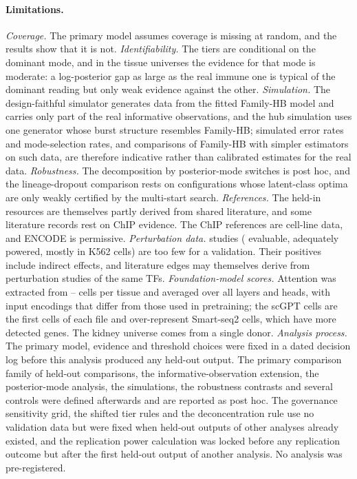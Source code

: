 \paragraph{Limitations.}
\emph{Coverage.} The primary model assumes coverage is missing at random, and the results show that it is not.
\emph{Identifiability.} The tiers are conditional on the dominant mode, and in the tissue universes the evidence for that mode is moderate: a log-posterior gap as large as the real immune one is typical of the dominant reading but only weak evidence against the other.
\emph{Simulation.} The design-faithful simulator generates data from the fitted Family-HB model and carries only part of the real informative observations, and the hub simulation uses one generator whose burst structure resembles Family-HB; simulated error rates and mode-selection rates, and comparisons of Family-HB with simpler estimators on such data, are therefore indicative rather than calibrated estimates for the real data.
\emph{Robustness.} The decomposition by posterior-mode switches is post hoc, and the lineage-dropout comparison rests on \nRobLinN{} configurations whose latent-class optima are only weakly certified by the multi-start search.
\emph{References.} The held-in resources are themselves partly derived from shared literature, and some literature records rest on ChIP evidence. The ChIP references are cell-line data, and ENCODE is permissive.
\emph{Perturbation data.} \nCohStudiesCap{} studies (\nRepPassAllD{} evaluable, \nRepPassPowD{} adequately powered, mostly in K562 cells) are too few for a validation. Their positives include indirect effects, and literature edges may themselves derive from perturbation studies of the same TFs.
\emph{Foundation-model scores.} Attention was extracted from \nFmCellsMin{}--\nFmCellsMax{} cells per tissue and averaged over all layers and heads, with input encodings that differ from those used in pretraining; the scGPT cells are the first cells of each file and over-represent Smart-seq2 cells, which have more detected genes. The kidney universe comes from a single donor.
\emph{Analysis process.} The primary model, evidence and threshold choices were fixed in a dated decision log before this analysis produced any held-out output. The primary comparison family of held-out comparisons, the informative-observation extension, the posterior-mode analysis, the simulations, the robustness contrasts and several controls were defined afterwards and are reported as post hoc. The governance sensitivity grid, the shifted tier rules and the deconcentration rule use no validation data but were fixed when held-out outputs of other analyses already existed, and the replication power calculation was locked before any replication outcome but after the first held-out output of another analysis. No analysis was pre-registered.
